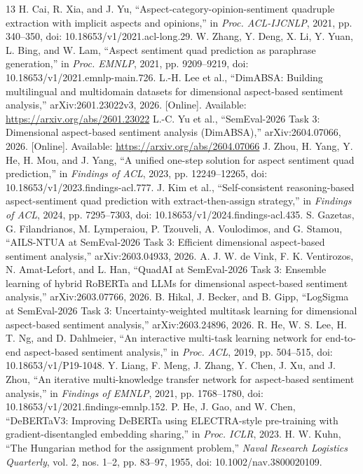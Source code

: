 \documentclass[conference]{IEEEtran}
\begin{document}
\begin{thebibliography}{13}
 H. Cai, R. Xia, and J. Yu, ``Aspect-category-opinion-sentiment quadruple extraction with implicit aspects and opinions,'' in \emph{Proc. ACL-IJCNLP}, 2021, pp. 340--350, doi: 10.18653/v1/2021.acl-long.29.
 W. Zhang, Y. Deng, X. Li, Y. Yuan, L. Bing, and W. Lam, ``Aspect sentiment quad prediction as paraphrase generation,'' in \emph{Proc. EMNLP}, 2021, pp. 9209--9219, doi: 10.18653/v1/2021.emnlp-main.726.
 L.-H. Lee et al., ``DimABSA: Building multilingual and multidomain datasets for dimensional aspect-based sentiment analysis,'' arXiv:2601.23022v3, 2026. [Online]. Available: \url{https://arxiv.org/abs/2601.23022}
 L.-C. Yu et al., ``SemEval-2026 Task 3: Dimensional aspect-based sentiment analysis (DimABSA),'' arXiv:2604.07066, 2026. [Online]. Available: \url{https://arxiv.org/abs/2604.07066}
 J. Zhou, H. Yang, Y. He, H. Mou, and J. Yang, ``A unified one-step solution for aspect sentiment quad prediction,'' in \emph{Findings of ACL}, 2023, pp. 12249--12265, doi: 10.18653/v1/2023.findings-acl.777.
 J. Kim et al., ``Self-consistent reasoning-based aspect-sentiment quad prediction with extract-then-assign strategy,'' in \emph{Findings of ACL}, 2024, pp. 7295--7303, doi: 10.18653/v1/2024.findings-acl.435.
 S. Gazetas, G. Filandrianos, M. Lymperaiou, P. Tzouveli, A. Voulodimos, and G. Stamou, ``AILS-NTUA at SemEval-2026 Task 3: Efficient dimensional aspect-based sentiment analysis,'' arXiv:2603.04933, 2026.
 A. J. W. de Vink, F. K. Ventirozos, N. Amat-Lefort, and L. Han, ``QuadAI at SemEval-2026 Task 3: Ensemble learning of hybrid RoBERTa and LLMs for dimensional aspect-based sentiment analysis,'' arXiv:2603.07766, 2026.
 B. Hikal, J. Becker, and B. Gipp, ``LogSigma at SemEval-2026 Task 3: Uncertainty-weighted multitask learning for dimensional aspect-based sentiment analysis,'' arXiv:2603.24896, 2026.
 R. He, W. S. Lee, H. T. Ng, and D. Dahlmeier, ``An interactive multi-task learning network for end-to-end aspect-based sentiment analysis,'' in \emph{Proc. ACL}, 2019, pp. 504--515, doi: 10.18653/v1/P19-1048.
 Y. Liang, F. Meng, J. Zhang, Y. Chen, J. Xu, and J. Zhou, ``An iterative multi-knowledge transfer network for aspect-based sentiment analysis,'' in \emph{Findings of EMNLP}, 2021, pp. 1768--1780, doi: 10.18653/v1/2021.findings-emnlp.152.
 P. He, J. Gao, and W. Chen, ``DeBERTaV3: Improving DeBERTa using ELECTRA-style pre-training with gradient-disentangled embedding sharing,'' in \emph{Proc. ICLR}, 2023.
 H. W. Kuhn, ``The Hungarian method for the assignment problem,'' \emph{Naval Research Logistics Quarterly}, vol. 2, nos. 1--2, pp. 83--97, 1955, doi: 10.1002/nav.3800020109.
\end{thebibliography}
\end{document}

